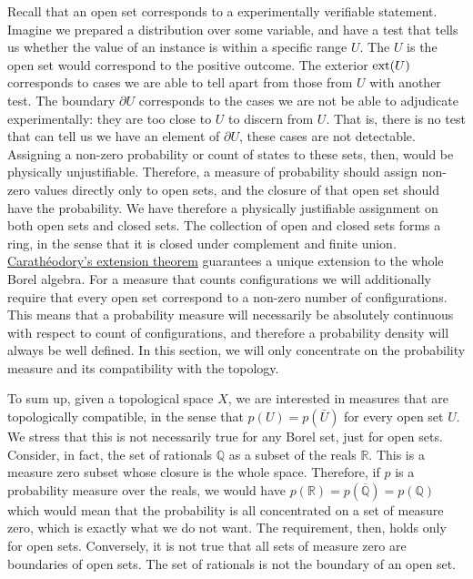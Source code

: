 Recall that an open set corresponds to a experimentally verifiable statement. Imagine we prepared a distribution over some variable, and have a test that tells us whether the value of an instance is within a specific range $U$. The $U$ is the open set would correspond to the positive outcome. The exterior $\operatorname{ext}(U)$ corresponds to cases we are able to tell apart from those from $U$ with another test. The boundary $\partial U$ corresponds to the cases we are not be able to adjudicate experimentally: they are too close to $U$ to discern from $U$. That is, there is no test that can tell us we have an element of $\partial U$, these cases are not detectable. Assigning a non-zero probability or count of states to these sets, then, would be physically unjustifiable. Therefore, a measure of probability should assign non-zero values directly only to open sets, and the closure of that open set should have the probability. We have therefore a physically justifiable assignment on both open sets and closed sets. The collection of open and closed sets forms a ring, in the sense that it is closed under complement and finite union. \href{https://en.wikipedia.org/wiki/Carath%C3%A9odory's_extension_theorem}{Carath\'{e}odory's extension theorem} guarantees a unique extension to the whole Borel algebra. For a measure that counts configurations we will additionally require that every open set correspond to a non-zero number of configurations. This means that a probability measure will necessarily be absolutely continuous with respect to count of configurations, and therefore a probability density will always be well defined. In this section, we will only concentrate on the probability measure and its compatibility with the topology.

To sum up, given a topological space $X$, we are interested in measures that are topologically compatible, in the sense that $p(U) = p(\bar{U})$ for every open set $U$. We stress that this is not necessarily true for any Borel set, just for open sets. Consider, in fact, the set of rationals $\mathbb{Q}$ as a subset of the reals $\mathbb{R}$. This is a measure zero subset whose closure is the whole space. Therefore, if $p$ is a probability measure over the reals, we would have $p(\mathbb{R}) = p(\overline{\mathbb{Q}}) = p(\mathbb{Q})$ which would mean that the probability is all concentrated on a set of measure zero, which is exactly what we do not want. The requirement, then, holds only for open sets. Conversely, it is not true that all sets of measure zero are boundaries of open sets. The set of rationals is not the boundary of an open set.


